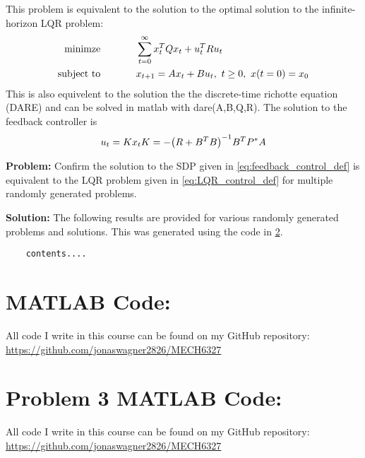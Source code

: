 \documentclass[letter]{article}
\begin{document}
This problem is equivalent to the solution to the optimal solution to the infinite-horizon LQR problem:
\begin{equation}\label{eq:LQR_control_def}
	\begin{aligned}
		\text{minimze} \hspace{0.5in}& \sum_{t=0}^\infty x_t^T Q x_t + u_t^T R u_t\\
		\text{subject to} \hspace{0.5in}
		& x_{t+1} = Ax_t + B u_t, \ t \geq 0, \ x(t=0) = x_0
	\end{aligned}
\end{equation}
This is also equivelent to the solution the the discrete-time richotte equation (DARE) and can be solved in matlab with dare(A,B,Q,R). The solution to the feedback controller is
\begin{equation}\label{eq:LQR_control_solution}
	u_t = K x_t\\
	K = -\qty(R + B^T B)^{-1} B^T P^* A
\end{equation}

\textbf{Problem:}
Confirm the solution to the SDP given in \eqref{eq:feedback_control_def} is equivalent to the LQR problem given in \eqref{eq:LQR_control_def} for multiple randomly generated problems.

\textbf{Solution:}
The following results are provided for various randomly generated problems and solutions. This was generated using the code in \appendixname \ref{apx:pblm3_matlab}.

\begin{Verbatim}
	contents....
\end{Verbatim}















\newpage
\appendix
\section{MATLAB Code:}\label{apx:matlab}
All code I write in this course can be found on my GitHub repository:\\
\href{https://github.com/jonaswagner2826/MECH6313}{https://github.com/jonaswagner2826/MECH6327}
%


\newpage
\section{Problem 3 MATLAB Code:}\label{apx:pblm3_matlab}
All code I write in this course can be found on my GitHub repository:\\
\href{https://github.com/jonaswagner2826/MECH6313}{https://github.com/jonaswagner2826/MECH6327}
%












\newpage


\end{document}
